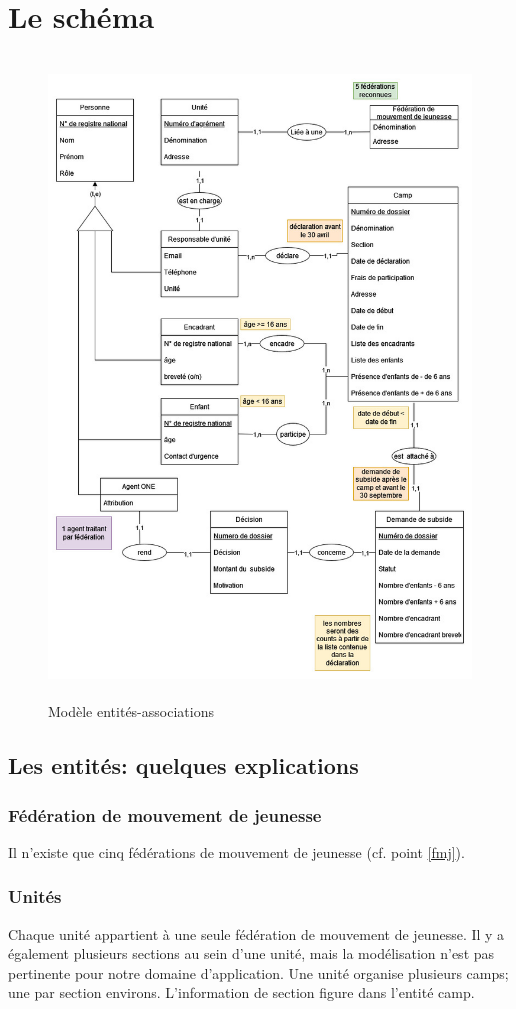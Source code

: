 \section{Le schéma}
\begin{figure}[H]
    \centering
    \includegraphics[height=17cm]{Pictures/modele_ea.jpg}
    \caption{Modèle entités-associations}
    \label{fig:modele_ea}
\end{figure}

\subsection{Les entités: quelques explications}

\subsubsection{Fédération de mouvement de jeunesse}
Il n'existe que cinq fédérations de mouvement de jeunesse (cf. point \ref{fmj}). 

\subsubsection{Unités}
Chaque unité appartient à une seule fédération de mouvement de jeunesse. Il y a également plusieurs sections au sein d'une unité, mais la modélisation n'est pas pertinente pour notre domaine d'application. Une unité organise plusieurs camps; une par section environs. L'information de section figure dans l'entité camp. 


